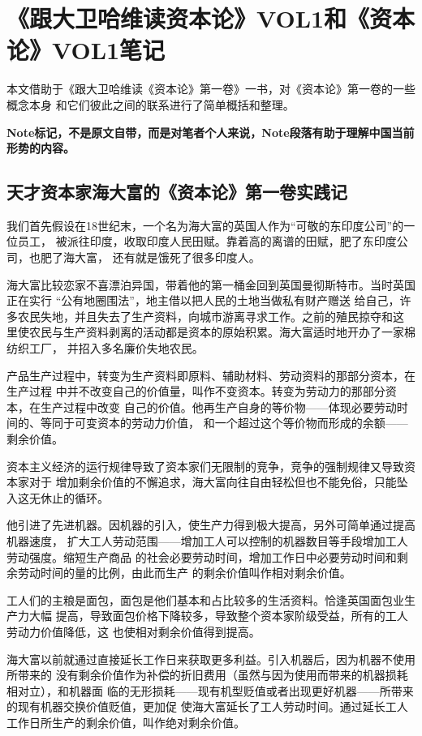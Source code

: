 \part{《跟大卫哈维读资本论》VOL1和《资本论》VOL1笔记}
\label{HarveyVol1}

本文借助于《跟大卫哈维读《资本论》第一卷》一书，对《资本论》第一卷的一些概念本身
和它们彼此之间的联系进行了简单概括和整理。

\textbf{Note标记，不是原文自带，而是对笔者个人来说，Note段落有助于理解中国当前形势的内容。}

\chapter{天才资本家海大富的《资本论》第一卷实践记}
\label{cha:Capital}


我们首先假设在18世纪末，一个名为海大富的英国人作为“可敬的东印度公司”的一位员工，
被派往印度，收取印度人民田赋。靠着高的离谱的田赋，肥了东印度公司，也肥了海大富，
还有就是饿死了很多印度人。

海大富比较恋家不喜漂泊异国，带着他的第一桶金回到英国曼彻斯特市。当时英国正在实行
“公有地圈围法”，地主借以把人民的土地当做私有财产赠送
给自己，许多农民失地，并且失去了生产资料，向城市游离寻求工作。之前的殖民掠夺和这
里使农民与生产资料剥离的活动都是资本的原始积累。海大富适时地开办了一家棉纺织工厂，
并招入多名廉价失地农民。\bigskip


产品生产过程中，转变为生产资料即原料、辅助材料、劳动资料的那部分资本，在生产过程
中并不改变自己的价值量，叫作不变资本。转变为劳动力的那部分资本，在生产过程中改变
自己的价值。他再生产自身的等价物——体现必要劳动时间的、等同于可变资本的劳动力价值，
和一个超过这个等价物而形成的余额——剩余价值。 \bigskip


资本主义经济的运行规律导致了资本家们无限制的竞争，竞争的强制规律又导致资本家对于
增加剩余价值的不懈追求，海大富向往自由轻松但也不能免俗，只能坠入这无休止的循环。

他引进了先进机器。因机器的引入，使生产力得到极大提高，另外可简单通过提高机器速度，
扩大工人劳动范围——增加工人可以控制的机器数目等手段增加工人劳动强度。缩短生产商品
的社会必要劳动时间，增加工作日中必要劳动时间和剩余劳动时间的量的比例，由此而生产
的剩余价值叫作相对剩余价值。

工人们的主粮是面包，面包是他们基本和占比较多的生活资料。恰逢英国面包业生产力大幅
提高，导致面包价格下降较多，导致整个资本家阶级受益，所有的工人劳动力价值降低，这
也使相对剩余价值得到提高。 \bigskip


海大富以前就通过直接延长工作日来获取更多利益。引入机器后，因为机器不使用所带来的
没有剩余价值作为补偿的折旧费用（虽然与因为使用而带来的机器损耗相对立），和机器面
临的无形损耗——现有机型贬值或者出现更好机器——所带来的现有机器交换价值贬值，更加促
使海大富延长了工人劳动时间。通过延长工人工作日所生产的剩余价值，叫作绝对剩余价值。
\bigskip


